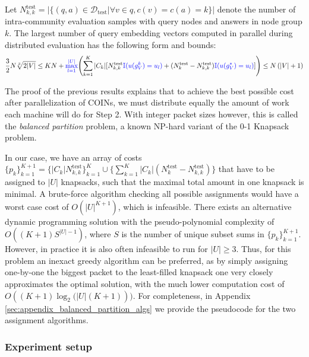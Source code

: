 \begin{proposition}
\label{proposition:complexity_distributed}
    Let $N_{k,k}^{\text{test}}=|\{(q, a) \in \mathcal{D}_{\text{test}}|\forall v \in q, c(v)=c(a)=k\}|$ denote the number of intra-community evaluation samples with query nodes and answers in node group $k$. The largest number of query embedding vectors computed in parallel during distributed evaluation has the following form and bounds:
\begin{equation}
\label{eq:complexity_and_bounds_distributed}
\frac{3}{2} N \sqrt[3]{2|V|} \leq KN+\textcolor{blue}{\max_{l=1}^{|U|}}{\left(\sum_{k=1}^{K}{|C_k|[N_{k,k}^{\text{test}}\textcolor{blue}{\mathbb{I}(u(g_V^k)=u_l)} + (N_k^{\text{test}}-N_{k,k}^{\text{test}})\textcolor{blue}{\mathbb{I}(u(g_V^*)=u_l)}]}\right)} \leq N \left(|V| + 1\right) 
\end{equation}
\end{proposition}

The proof of the previous results explains that to achieve the best possible cost after parallelization of COINs, we must distribute equally the amount of work each machine will do for Step 2. With integer packet sizes however, this is called the \emph{balanced partition} problem, a known NP-hard variant of the 0-1 Knapsack problem. 

In our case, we have an array of costs $\{p_k\}_{k=1}^{K+1}=\{|C_k|N_{k,k}^{\text{test}}\}_{k=1}^{K}\cup\{\sum_{k=1}^{K}{|C_k|(N_{k}^{\text{test}}-N_{k,k}^{\text{test}})}\}$ that have to be assigned to $|U|$ knapsacks, such that the maximal total amount in one knapsack is minimal. A brute-force algorithm checking all possible assignments would have a worst case cost of $O(|U|^{K+1})$, which is infeasible. There exists an alternative dynamic programming solution with the pseudo-polynomial complexity of $O((K+1)S^{|U|-1})$, where $S$ is the number of unique subset sums in $\{p_k\}_{k=1}^{K+1}$. However, in practice it is also often infeasible to run for $|U|\geq 3$. Thus, for this problem an inexact greedy algorithm can be preferred, as by simply assigning one-by-one the biggest packet to the least-filled knapsack one very closely approximates the optimal solution, with the much lower computation cost of $O((K+1)\log_2{(|U|(K+1)}))$. For completeness, in Appendix \ref{sec:appendix_balanced_partition_algs} we provide the pseudocode for the two assignment algorithms.

\subsubsection{Experiment setup}

